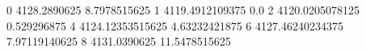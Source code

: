 0 4128.2890625 8.7978515625
1 4119.4912109375 0.0
2 4120.0205078125 0.529296875
4 4124.12353515625 4.63232421875
6 4127.46240234375 7.97119140625
8 4131.0390625 11.5478515625

